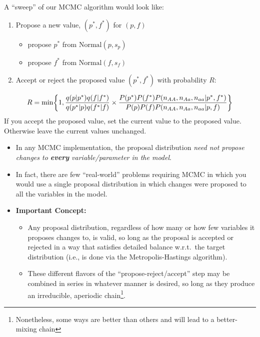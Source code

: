 \newpage

A ``sweep'' of our MCMC algorithm would look like:
\begin{enumerate}
\item Propose a new value, $(p^*,f^*)$ for $(p,f)$
\begin{itemize}
\item propose $p^*$ from $\mathrm{Normal}(p,s_p)$
\item propose $f^*$ from $\mathrm{Normal}(f,s_f)$
\end{itemize}
\item Accept or reject the proposed value $(p^*,f^*)$ with probability $R$:
\end{enumerate}
\[
\small
R=\min\biggr\{1,
\frac{q(p|p^*)q(f|f^*)}{q(p^*|p)q(f^*|f) } \times 
\frac{P(p^*)P(f^*)P(n_{AA},n_{Aa},n_{aa}|p^*,f^*)}{P(p)P(f)P(n_{AA},n_{Aa},n_{aa}|p,f)}
\biggl\}
\]
If you accept the proposed value, set the current value to the proposed value.  Otherwise leave the current values unchanged.



\begin{itemize}
\item In any MCMC implementation, the proposal distribution {\em need not propose changes to {\bf every} variable/parameter  in the model}.
\item In fact, there are few ``real-world'' problems requiring MCMC in which you would use a single proposal distribution in which changes were proposed to all the variables in the model.
\item {\bf Important Concept:}
\begin{itemize}
\item Any proposal distribution, regardless of how many or how few variables it proposes changes to, is valid, so long as the proposal is accepted or rejected in a way that satisfies detailed balance w.r.t.\ the target distribution (i.e., is done via the Metropolis-Hastings algorithm).
\item These different flavors of the ``propose-reject/accept'' step may be combined in series in whatever manner is desired, so long as they produce an irreducible, aperiodic chain\footnote{Nonetheless, some ways are better than others and will lead to a better-mixing chain}. 
\end{itemize}
\end{itemize}


